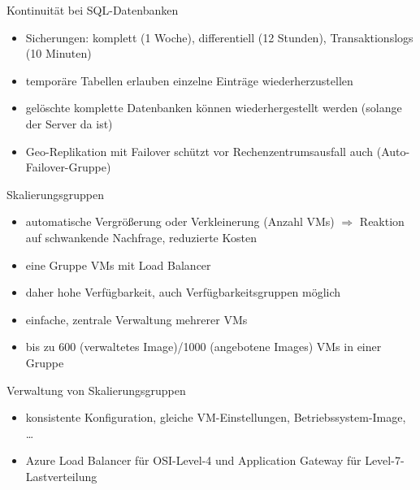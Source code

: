 \begin{flashcard}[]{Kontinuität bei SQL-Datenbanken}
  \begin{itemize}
    \item Sicherungen: komplett (1 Woche), differentiell (12 Stunden), Transaktionslogs (10 Minuten)
    \item temporäre Tabellen erlauben einzelne Einträge wiederherzustellen
    \item gelöschte komplette Datenbanken können wiederhergestellt werden (solange der Server da ist)
    \item Geo-Replikation mit Failover schützt vor Rechenzentrumsausfall\newline
      auch (Auto-Failover-Gruppe)
  \end{itemize}
\end{flashcard}


\begin{flashcard}[]{Skalierungsgruppen}
  \begin{itemize}
    \item automatische Vergrößerung oder Verkleinerung (Anzahl VMs)\newline
      $\Rightarrow$ Reaktion auf schwankende Nachfrage, reduzierte Kosten
    \item eine Gruppe VMs mit Load Balancer
    \item daher hohe Verfügbarkeit, auch Verfügbarkeitsgruppen möglich
    \item einfache, zentrale Verwaltung mehrerer VMs
    \item bis zu 600 (verwaltetes Image)/1000 (angebotene Images) VMs in einer Gruppe
  \end{itemize}
\end{flashcard}

\begin{flashcard}[]{Verwaltung von Skalierungsgruppen}
  \begin{itemize}
    \item konsistente Konfiguration, gleiche VM-Einstellungen, Betriebssystem-Image, \ldots
    \item Azure Load Balancer für OSI-Level-4 und Application Gateway für Level-7-Lastverteilung
  \end{itemize}
\end{flashcard}

